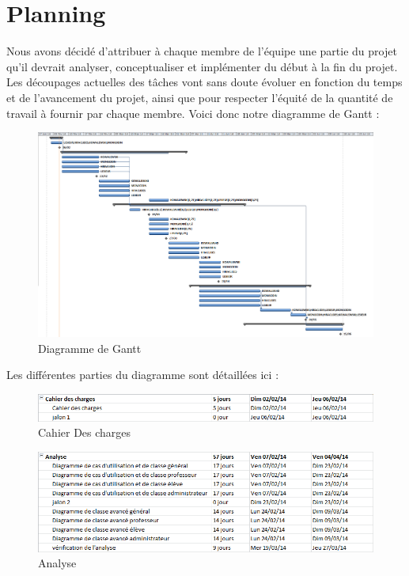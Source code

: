 \documentclass[10pt,a4paper,titlepage]{report}
\begin{document}
	\section{Planning}
	Nous avons décidé d'attribuer à chaque membre de l'équipe une partie du projet qu'il devrait analyser, conceptualiser et implémenter du début à la fin du projet. Les découpages actuelles des tâches vont sans doute évoluer en fonction du temps et de l'avancement du projet, ainsi que pour respecter l'équité de la quantité de travail à fournir par chaque membre.
	Voici donc notre diagramme de Gantt :
	\begin{figure}[h!]
\caption{Diagramme de Gantt}
\centering
\includegraphics[scale=0.3]{Include/gantt.png}
\end{figure}
\newpage
Les différentes parties du diagramme sont détaillées ici :
	\begin{figure}[h!]
\caption{Cahier Des charges}
\centering
\includegraphics[scale=0.6]{Include/cahier.png}
\end{figure}
	\begin{figure}[h!]
\caption{Analyse}
\centering
\includegraphics[scale=0.6]{Include/Analyse.png}
\end{figure}
\end{document}
